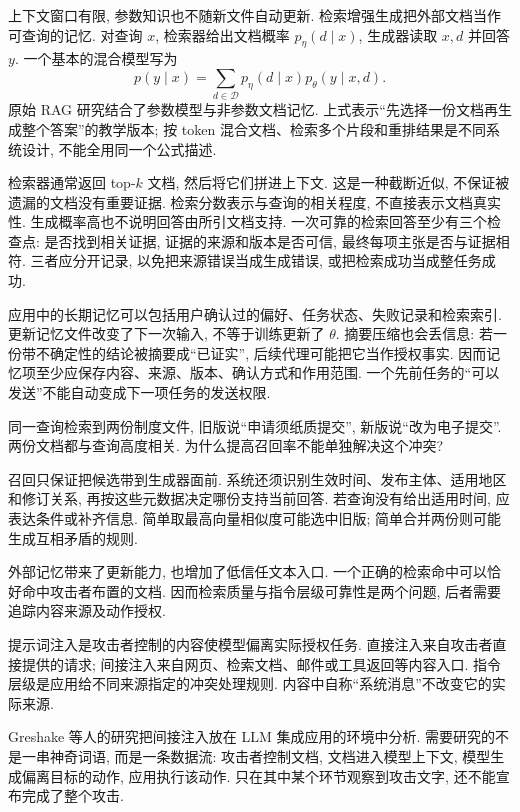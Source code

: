 上下文窗口有限, 参数知识也不随新文件自动更新. 检索增强生成把外部文档当作可查询的记忆. 对查询 $x$, 检索器给出文档概率 $p_\eta(d\mid x)$, 生成器读取 $x,d$ 并回答 $y$. 一个基本的混合模型写为
\[
p(y\mid x)=\sum_{d\in\mathcal D}p_\eta(d\mid x)p_\theta(y\mid x,d).
\]
原始 RAG 研究结合了参数模型与非参数文档记忆\cite{rag}. 上式表示“先选择一份文档再生成整个答案”的教学版本; 按 token 混合文档、检索多个片段和重排结果是不同系统设计, 不能全用同一个公式描述.

检索器通常返回 top-$k$ 文档, 然后将它们拼进上下文. 这是一种截断近似, 不保证被遗漏的文档没有重要证据. 检索分数表示与查询的相关程度, 不直接表示文档真实性. 生成概率高也不说明回答由所引文档支持. 一次可靠的检索回答至少有三个检查点: 是否找到相关证据, 证据的来源和版本是否可信, 最终每项主张是否与证据相符. 三者应分开记录, 以免把来源错误当成生成错误, 或把检索成功当成整任务成功.

应用中的长期记忆可以包括用户确认过的偏好、任务状态、失败记录和检索索引. 更新记忆文件改变了下一次输入, 不等于训练更新了 $\theta$. 摘要压缩也会丢信息: 若一份带不确定性的结论被摘要成“已证实”, 后续代理可能把它当作授权事实. 因而记忆项至少应保存内容、来源、版本、确认方式和作用范围. 一个先前任务的“可以发送”不能自动变成下一项任务的发送权限.

\begin{example}
同一查询检索到两份制度文件, 旧版说“申请须纸质提交”, 新版说“改为电子提交”. 两份文档都与查询高度相关. 为什么提高召回率不能单独解决这个冲突?
\end{example}
\begin{solution}
召回只保证把候选带到生成器面前. 系统还须识别生效时间、发布主体、适用地区和修订关系, 再按这些元数据决定哪份支持当前回答. 若查询没有给出适用时间, 应表达条件或补齐信息. 简单取最高向量相似度可能选中旧版; 简单合并两份则可能生成互相矛盾的规则.
\end{solution}
外部记忆带来了更新能力, 也增加了低信任文本入口. 一个正确的检索命中可以恰好命中攻击者布置的文档. 因而检索质量与指令层级可靠性是两个问题, 后者需要追踪内容来源及动作授权.

\begin{definition}
提示词注入是攻击者控制的内容使模型偏离实际授权任务. 直接注入来自攻击者直接提供的请求; 间接注入来自网页、检索文档、邮件或工具返回等内容入口. 指令层级是应用给不同来源指定的冲突处理规则. 内容中自称“系统消息”不改变它的实际来源.
\end{definition}
Greshake 等人的研究把间接注入放在 LLM 集成应用的环境中分析\cite{injection}. 需要研究的不是一串神奇词语, 而是一条数据流: 攻击者控制文档, 文档进入模型上下文, 模型生成偏离目标的动作, 应用执行该动作. 只在其中某个环节观察到攻击文字, 还不能宣布完成了整个攻击.

